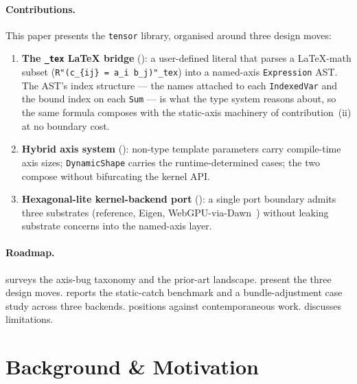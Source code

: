 \documentclass[10pt,twocolumn]{article}
\newcommand{\udltex}{\code{\_tex}}                            %
\newcommand{\code}[1]{\texttt{#1}}
\begin{document}
\paragraph{Contributions.}
This paper presents the \code{tensor} library, organised around three
design moves:

\begin{enumerate}
  \item \textbf{The \udltex{} LaTeX bridge} (): a
        user-defined literal that parses a LaTeX-math subset
        (\code{R"(c\_\{ij\} = a\_i b\_j)"\_tex}) into a named-axis
        \code{Expression} AST. The AST's index structure --- the
        names attached to each \code{IndexedVar} and the bound index
        on each \code{Sum} --- is what the type system reasons about,
        so the same formula composes with the static-axis machinery
        of contribution~(ii) at no boundary cost.
  \item \textbf{Hybrid axis system} (): non-type
        template parameters carry compile-time axis sizes;
        \code{DynamicShape} carries the runtime-determined cases; the
        two compose without bifurcating the kernel API.
  \item \textbf{Hexagonal-lite kernel-backend port}
        (): a single port boundary admits three
        substrates (reference, Eigen, WebGPU-via-Dawn~\cite{dawn})
        without leaking substrate concerns into the named-axis layer.
\end{enumerate}

\paragraph{Roadmap.}
 surveys the axis-bug taxonomy and the prior-art landscape.
 present the three design moves.
 reports the static-catch benchmark and a
bundle-adjustment case study across three backends. 
positions against contemporaneous work.  discusses
limitations.

\section{Background \& Motivation}
\label{sec:bg}

\end{document}
